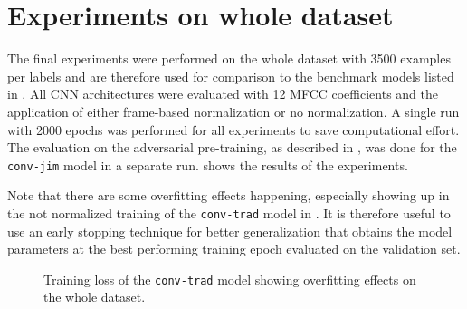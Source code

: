 
\section{Experiments on whole dataset}\label{sec:exp_final}
The final experiments were performed on the whole dataset with 3500 examples per labels and are therefore used for comparison to the benchmark models listed in .
All CNN architectures were evaluated with 12 MFCC coefficients and the application of either frame-based normalization or no normalization.
A single run with 2000 epochs was performed for all experiments to save computational effort.
The evaluation on the adversarial pre-training, as described in , was done for the \texttt{conv-jim} model in a separate run.
 shows the results of the experiments.

Note that there are some overfitting effects happening, especially showing up in the not normalized training of the \texttt{conv-trad} model in .
It is therefore useful to use an early stopping technique for better generalization that obtains the model parameters at the best performing training epoch evaluated on the validation set.
\begin{figure}[!ht]
  \centering
  \caption{Training loss of the \texttt{conv-trad} model showing overfitting effects on the whole dataset.}
  \label{fig:exp_final_loss_conv-trad}
\end{figure}
